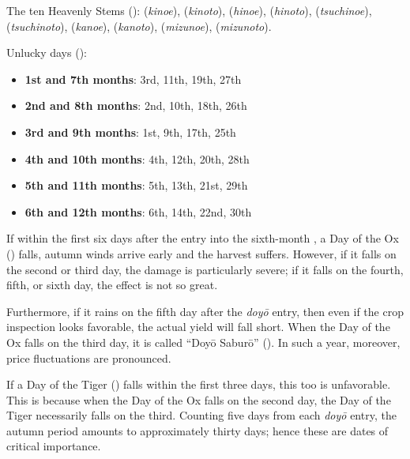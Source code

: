 \begin{sokyubox}
{\small\itshape\color{sokyubar} }

\medskip
The ten Heavenly Stems ():  (\textit{kinoe}),
 (\textit{kinoto}),  (\textit{hinoe}),
 (\textit{hinoto}),  (\textit{tsuchinoe}),
 (\textit{tsuchinoto}),  (\textit{kanoe}),
 (\textit{kanoto}),  (\textit{mizunoe}),
 (\textit{mizunoto}).

\medskip
Unlucky days ():

\begin{itemize}[nosep]
\item \textbf{1st and 7th months}: 3rd, 11th, 19th, 27th
\item \textbf{2nd and 8th months}: 2nd, 10th, 18th, 26th
\item \textbf{3rd and 9th months}: 1st, 9th, 17th, 25th
\item \textbf{4th and 10th months}: 4th, 12th, 20th, 28th
\item \textbf{5th and 11th months}: 5th, 13th, 21st, 29th
\item \textbf{6th and 12th months}: 6th, 14th, 22nd, 30th
\end{itemize}
\end{sokyubox}


\begin{sokyubox}
{\small\itshape\color{sokyubar} }

\medskip
If within the first six days after the entry into the sixth-month
, a Day of the Ox () falls,
autumn winds arrive early and the harvest suffers. However, if it
falls on the second or third day, the damage is particularly severe;
if it falls on the fourth, fifth, or sixth day, the effect is not
so great.

Furthermore, if it rains on the fifth day after the \textit{doy\=o} entry,
then even if the crop inspection looks favorable, the actual yield
will fall short. When the Day of the Ox falls on the third day, it
is called ``Doy\=o Sabur\=o'' (). In such a year, moreover,
price fluctuations are pronounced.

If a Day of the Tiger () falls within the first
three days, this too is unfavorable. This is because when the Day
of the Ox falls on the second day, the Day of the Tiger necessarily
falls on the third. Counting five days from each \textit{doy\=o} entry, the
autumn period amounts to approximately thirty days; hence these are
dates of critical importance.
\end{sokyubox}

